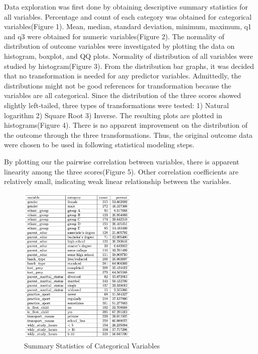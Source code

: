 \documentclass[
  12pt,
]{article}
\begin{document}
Data exploration was first done by obtaining descriptive summary
statistics for all variables. Percentage and count of each category was
obtained for categorical variables(Figure 1). Mean, median, standard
deviation, minimum, maximum, q1 and q3 were obtained for numeric
variables(Figure 2). The normality of distribution of outcome variables
were investigated by plotting the data on histogram, boxplot, and QQ
plots. Normality of distribution of all variables were studied by
histogram(Figure 3). From the distribution bar graphs, it was decided
that no transformation is needed for any predictor variables.
Admittedly, the distributions might not be good references for
transformation because the variables are all categorical. Since the
distribution of the three scores showed slightly left-tailed, three
types of transformations were tested: 1) Natural logarithm 2) Square
Root 3) Inverse. The resulting plots are plotted in histograms(Figure
4). There is no apparent improvement on the distribution of the outcome
through the three transformations. Thus, the original outcome data were
chosen to be used in following statistical modeling steps.

By plotting our the pairwise correlation between variables, there is
apparent linearity among the three scores(Figure 5). Other correlation
coefficients are relatively small, indicating weak linear relationship
between the variables.\\

\begin{figure}
  \centering
  \includegraphics[width=0.5\textwidth]{table1.png}
  \caption{Summary Statistics of Categorical Variables}
\end{figure}
\end{document}
